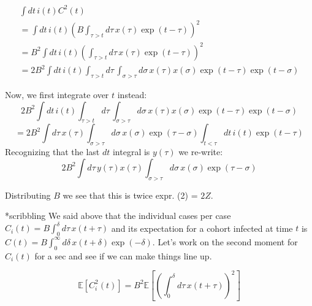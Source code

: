\documentclass[12pt]{article}
\begin{document}
\begin{eqnarray}
\int{dt\, i(t) C^2(t)}
	\\ = \int{dt\, i(t) \left(
		B \int_{\tau>t}{d\tau\, x(\tau) \exp(t-\tau)}
	\right)^2}
	\\ = B^2 \int{dt\, i(t) \left(
		\int_{\tau>t}{d\tau\, x(\tau) \exp(t-\tau)}
	\right)^2}
	\\ =  2B^2 \int{dt\, i(t) \int_{\tau>t}{d\tau\, \int_{\sigma>\tau}{d\sigma\, x(\tau) x(\sigma) \exp(t-\tau)\exp(t-\sigma)}}}
\end{eqnarray}

Now, we first integrate over $t$ instead:
  $$ 2B^2 \int{dt\, i(t) \int_{\tau>t}{d\tau\, \int_{\sigma>\tau}{d\sigma\, x(\tau) x(\sigma) \exp(t-\tau)\exp(t-\sigma)}}}$$
  $$ = 2B^2 \int{d\tau\, x(\tau) \int_{\sigma > \tau}{d\sigma\, x(\sigma) \exp(\tau-\sigma)\int_{t<\tau}{dt\, i(t) \exp(t-\tau)}}}$$
Recognizing that the last $dt$ integral is $y(\tau)$ we re-write:
 $$ 2B^2 \int{d\tau\, y(\tau)x(\tau) \int_{\sigma>\tau}{d\sigma\, x(\sigma) \exp(\tau-\sigma)}}$$

Distributing $B$ we see that this is twice expr. (2) = $2Z$.




%

*scribbling
We said above that the individual cases per case $C_i(t) = B\int_{0}^{\delta}{d\tau\, x(t + \tau)}$ and its expectation for a cohort infected at time $t$ is $C(t) = B\int_{0}^{\infty}{d\delta\, x(t+\delta) \exp(-\delta)}$. Let's work on the second moment for $C_i(t)$ for a sec and see if we can make things line up.

$$\mathbb{E}[C^2_i(t)] = B^2 \mathbb{E}\left[\left(
  \int_{0}^{\delta}{d\tau\, x(t+\tau)}\right)^2
  \right]$$
\end{document}
